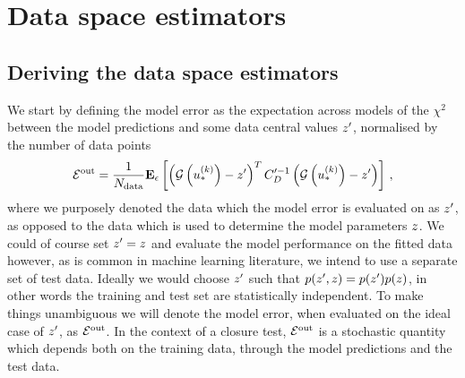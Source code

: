 \section{Data space estimators}

\subsection{Deriving the data space estimators}

We start by defining the model error as the expectation across models of the
$\chi^2$ between the model predictions and some data central values
$z^\prime$, normalised by the number of data points
\begin{equation}
    \label{eq:chi2kerep}
    \mathcal{E}^{\rm out} = \frac{1}{N_{\rm data}} \mathbf{E}_{\epsilon}\left[ 
        \left( \mathcal{G}\left(u_*^{(k)}\right) - z^\prime \right)^T
        C_D^{\prime -1}
        \left( \mathcal{G}\left(u_*^{(k)}\right) - z^\prime \right)
     \right]\, ,
\end{equation}
where we purposely denoted the data which the model error is evaluated on as
$z^\prime$, as opposed to the data which is used to determine the model
parameters $z$. We could of course set $z^\prime = z$ and
evaluate the model performance on the fitted data however, as is common in
machine learning literature, we intend to use a separate set of test data.
Ideally we would choose $z^\prime$ such that $p(z^\prime, z) =
p(z^\prime)p(z)$, in other words the training and test set are
statistically independent. To make things unambiguous we will denote the model
error, when evaluated on the ideal case of $z^\prime$, as $\mathcal{E}^{\rm out}$. In the
context of a closure test, $\mathcal{E}^{\rm out}$ is a stochastic quantity which depends both
on the training data, through the model predictions and the test data.

